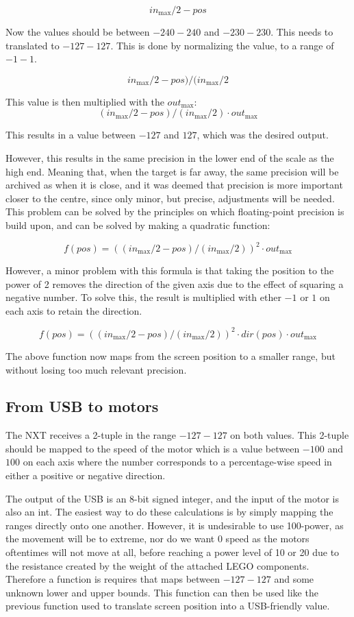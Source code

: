 $$
in_\text{max}/2 - pos
$$

Now the values should be between $-240 - 240$ and $-230 - 230$. This needs to translated to $-127 - 127$. This is done by normalizing the value, to a range of $-1 - 1$.

$$
in_\text{max}/2 - pos)/(in_\text{max}/2
$$


This value is then multiplied with the $out_\text{max}$:
$$
(in_\text{max}/2 - pos)/(in_\text{max}/2) \cdot out_\text{max}
$$

This results in a value between $-127$ and $127$, which was the desired output.


However, this results in the same precision in the lower end of the scale as the high end.
Meaning that, when the target is far away, the same precision will be archived as when it is close, and it was deemed that precision is more important closer to the centre, since only minor, but precise, adjustments will be needed.
This problem can be solved by the principles on which floating-point precision is build upon, and can be solved by making a quadratic function:

$$
f(pos) = ((in_\text{max}/2 - pos)/(in_\text{max}/2))^2 \cdot out_\text{max}
$$

However, a minor problem with this formula is that taking the position to the power of 2 removes the direction of the given axis due to the effect of squaring a negative number.
To solve this, the result is multiplied with ether $-1$ or $1$ on each axis to retain the direction.

$$
f(pos) = ((in_\text{max}/2 - pos)/(in_\text{max}/2))^2 \cdot dir(pos) \cdot out_\text{max}
$$

The above function now maps from the screen position to a smaller range, but without losing too much relevant precision.

\subsection{From USB to motors}
The NXT receives a 2-tuple in the range $-127 - 127$ on both values.
This 2-tuple should be mapped to the speed of the motor which is a value between $-100$ and $100$ on each axis where the number corresponds to a percentage-wise speed in either a positive or negative direction. 

The output of the USB is an 8-bit signed integer, and the input of the motor is also an int.
The easiest way to do these calculations is by simply mapping the ranges directly onto one another.
However, it is undesirable to use 100-power, as the movement will be to extreme, nor do we want 0 speed as the motors oftentimes will not move at all, before reaching a power level of 10 or 20 due to the resistance created by the weight of the attached LEGO components.
Therefore a function is requires that maps between $-127 - 127$ and some unknown lower and upper bounds.
This function can then be used like the previous function used to translate screen position into a USB-friendly value.

